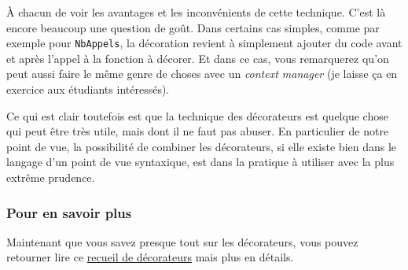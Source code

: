 À chacun de voir les avantages et les inconvénients de cette technique.
C'est là encore beaucoup une question de goût. Dans certains cas
simples, comme par exemple pour \texttt{NbAppels}, la décoration revient
à simplement ajouter du code avant et après l'appel à la fonction à
décorer. Et dans ce cas, vous remarquerez qu'on peut aussi faire le même
genre de choses avec un \emph{context manager} (je laisse ça en exercice
aux étudiants intéressés).

Ce qui est clair toutefois est que la technique des décorateurs est
quelque chose qui peut être très utile, mais dont il ne faut pas abuser.
En particulier de notre point de vue, la possibilité de combiner les
décorateurs, si elle existe bien dans le langage d'un point de vue
syntaxique, est dans la pratique à utiliser avec la plus extrême
prudence.

    \hypertarget{pour-en-savoir-plus}{%
\subsubsection{Pour en savoir plus}\label{pour-en-savoir-plus}}

    Maintenant que vous savez presque tout sur les décorateurs, vous pouvez
retourner lire ce
\href{https://wiki.python.org/moin/PythonDecoratorLibrary}{recueil de
décorateurs} mais plus en détails.


    
    
    
